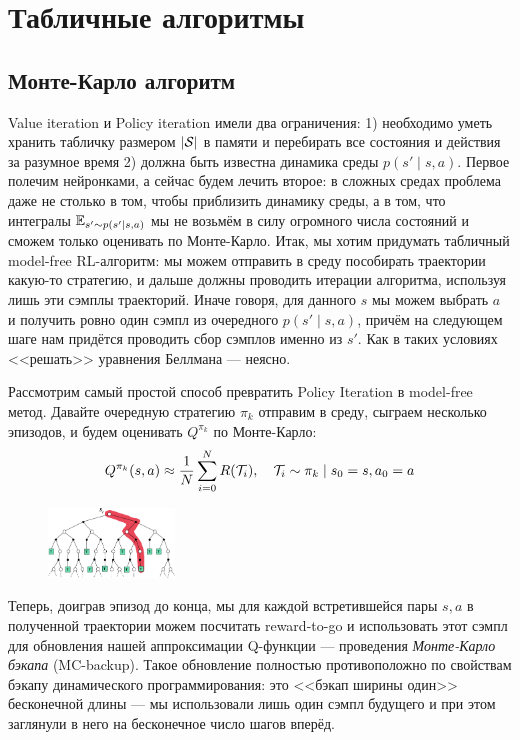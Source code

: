 \section{Табличные алгоритмы}\label{sec:tabularrlsection}

\subsection{Монте-Карло алгоритм}

Value iteration и Policy iteration имели два ограничения: 1) необходимо уметь хранить табличку размером $| \mathcal{S} |$ в памяти и перебирать все состояния и действия за разумное время 2) должна быть известна динамика среды $p(s' \mid s, a)$. Первое полечим нейронками, а сейчас будем лечить второе: в сложных средах проблема даже не столько в том, чтобы приблизить динамику среды, а в том, что интегралы $\mathbb{E}_{s' \sim p(s' \mid s, a)}$ мы не возьмём в силу огромного числа состояний и сможем только оценивать по Монте-Карло. 
Итак, мы хотим придумать табличный model-free RL-алгоритм: мы можем отправить в среду пособирать траектории какую-то стратегию, и дальше должны проводить итерации алгоритма, используя лишь эти сэмплы траекторий. Иначе говоря, для данного $s$ мы можем выбрать $a$ и получить ровно один сэмпл из очередного $p(s' \mid s, a)$, причём на следующем шаге нам придётся проводить сбор сэмплов именно из $s'$. Как в таких условиях <<решать>> уравнения Беллмана --- неясно.

Рассмотрим самый простой способ превратить Policy Iteration в model-free метод. Давайте очередную стратегию $\pi_k$ отправим в среду, сыграем несколько эпизодов, и будем оценивать $Q^{\pi_k}$ по Монте-Карло:
$$Q^{\pi_k}(s, a) \approx \frac{1}{N} \sum_{i=0}^N R(\mathcal{T}_i), \quad \mathcal{T}_i \sim \pi_k \mid s_0 = s, a_0 = a$$

\begin{figure}
\vspace{-0.3cm}
\centering
\includegraphics[width=0.3\textwidth]{Images/MC_backup.png}
\vspace{-0.3cm}
\end{figure}
Теперь, доиграв эпизод до конца, мы для каждой встретившейся пары $s, a$ в полученной траектории можем посчитать reward-to-go и использовать этот сэмпл для обновления нашей аппроксимации Q-функции --- проведения \emph{Монте-Карло бэкапа} (MC-backup). Такое обновление полностью противоположно по свойствам бэкапу динамического программирования: это <<бэкап ширины один>> бесконечной длины --- мы использовали лишь один сэмпл будущего и при этом заглянули в него на бесконечное число шагов вперёд.

